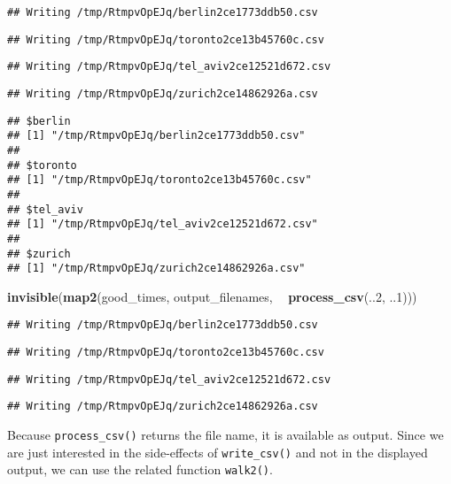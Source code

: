 \documentclass[]{book}
\newenvironment{Shaded}{\begin{snugshade}}{\end{snugshade}}
\newcommand{\DecValTok}[1]{\textcolor[rgb]{0.00,0.00,0.81}{#1}}
\newcommand{\KeywordTok}[1]{\textcolor[rgb]{0.13,0.29,0.53}{\textbf{#1}}}
\newcommand{\NormalTok}[1]{#1}
\newcommand{\OperatorTok}[1]{\textcolor[rgb]{0.81,0.36,0.00}{\textbf{#1}}}
\newcommand{\StringTok}[1]{\textcolor[rgb]{0.31,0.60,0.02}{#1}}
\begin{document}
\begin{verbatim}
## Writing /tmp/RtmpvOpEJq/berlin2ce1773ddb50.csv
\end{verbatim}

\begin{verbatim}
## Writing /tmp/RtmpvOpEJq/toronto2ce13b45760c.csv
\end{verbatim}

\begin{verbatim}
## Writing /tmp/RtmpvOpEJq/tel_aviv2ce12521d672.csv
\end{verbatim}

\begin{verbatim}
## Writing /tmp/RtmpvOpEJq/zurich2ce14862926a.csv
\end{verbatim}

\begin{verbatim}
## $berlin
## [1] "/tmp/RtmpvOpEJq/berlin2ce1773ddb50.csv"
## 
## $toronto
## [1] "/tmp/RtmpvOpEJq/toronto2ce13b45760c.csv"
## 
## $tel_aviv
## [1] "/tmp/RtmpvOpEJq/tel_aviv2ce12521d672.csv"
## 
## $zurich
## [1] "/tmp/RtmpvOpEJq/zurich2ce14862926a.csv"
\end{verbatim}

\begin{Shaded}
\begin{Highlighting}[]
\KeywordTok{invisible}\NormalTok{(}\KeywordTok{map2}\NormalTok{(good_times, output_filenames, }\OperatorTok{~}\StringTok{ }\KeywordTok{process_csv}\NormalTok{(..}\DecValTok{2}\NormalTok{, ..}\DecValTok{1}\NormalTok{)))}
\end{Highlighting}
\end{Shaded}

\begin{verbatim}
## Writing /tmp/RtmpvOpEJq/berlin2ce1773ddb50.csv
\end{verbatim}

\begin{verbatim}
## Writing /tmp/RtmpvOpEJq/toronto2ce13b45760c.csv
\end{verbatim}

\begin{verbatim}
## Writing /tmp/RtmpvOpEJq/tel_aviv2ce12521d672.csv
\end{verbatim}

\begin{verbatim}
## Writing /tmp/RtmpvOpEJq/zurich2ce14862926a.csv
\end{verbatim}

Because \texttt{process\_csv()} returns the file name, it is available as output.
Since we are just interested in the side-effects of \texttt{write\_csv()} and not in the displayed output, we can use the related function \texttt{walk2()}.
\end{document}
